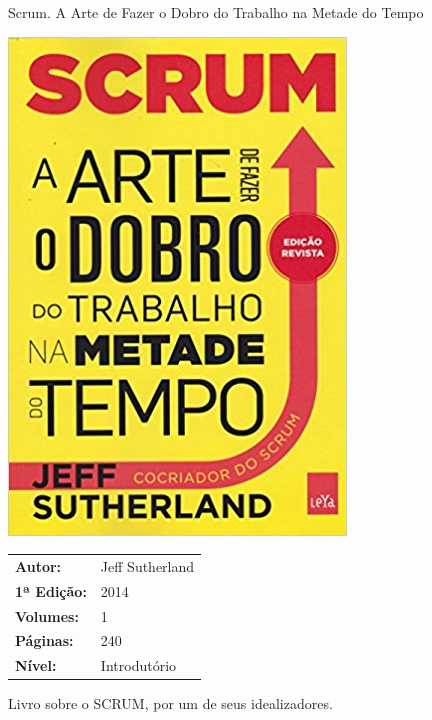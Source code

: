 \begin{frame}[fragile]{Scrum. A Arte de Fazer o Dobro do Trabalho na Metade do Tempo}

    \begin{minipage}{0.4\textwidth}
        \includegraphics[scale=0.25]{scrum.jpg}
    \end{minipage}
    \begin{minipage}{0.5\textwidth}
        \begin{small}
            \begin{tabularx}{0.95\textwidth}{lX}
                \textbf{Autor:} & Jeff Sutherland \\
                \textbf{1ª Edição:} & 2014 \\
                \textbf{Volumes:} & 1 \\
                \textbf{Páginas:} & 240 \\
                \textbf{Nível:} & Introdutório \\
            \end{tabularx}
        \end{small}
    \end{minipage}

    \vspace{0.2in} 

    Livro sobre o SCRUM, por um de seus idealizadores.

\end{frame}

